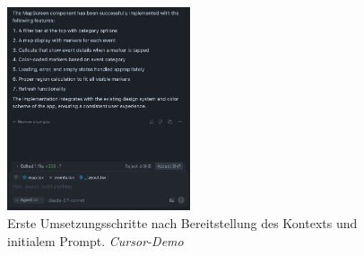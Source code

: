 \begin{figure}[htbp]
      \centering
      \vspace{1em}
      \includegraphics[width=0.48\textwidth]{images/cursor_screenshots/erster durchgang-cursor.png}
      \caption{Erste Umsetzungsschritte nach Bereitstellung des Kontexts und initialem Prompt. \textit{Cursor-Demo}}
      \label{fig:cursor-erster-durchgang}
\end{figure}

